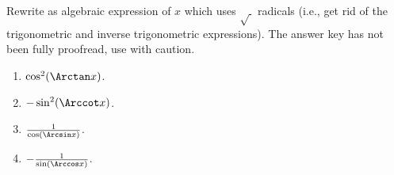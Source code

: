 Rewrite as algebraic expression of $x$ which uses $\sqrt{~}$ radicals (i.e., get rid of the trigonometric and inverse trigonometric expressions). The answer key has not been fully proofread, use with caution.

\begin{multicols}{2}
\begin{enumerate}
\item $\cos^2(\Arctan x)$. 
\item $-\sin^2(\Arccot x)$. 
\item $\frac{1}{\cos(\Arcsin x)}$. 
\item $-\frac{1}{\sin(\Arccos x)}$.
\end{enumerate}
\end{multicols}
